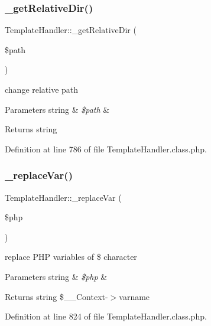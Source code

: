 \subsubsection{\texorpdfstring{\+\_\+get\+Relative\+Dir()}{\_getRelativeDir()}}
{\footnotesize\ttfamily Template\+Handler\+::\+\_\+get\+Relative\+Dir (\begin{DoxyParamCaption}\item[{}]{\$path }\end{DoxyParamCaption})}

change relative path 
\begin{DoxyParams}[1]{Parameters}
string & {\em \$path} & \\
\hline
\end{DoxyParams}
\begin{DoxyReturn}{Returns}
string 
\end{DoxyReturn}


Definition at line 786 of file Template\+Handler.\+class.\+php.

\mbox{\label{classTemplateHandler_a10cb255c35e1e617f182e349b80cc335}} 
\subsubsection{\texorpdfstring{\+\_\+replace\+Var()}{\_replaceVar()}}
{\footnotesize\ttfamily Template\+Handler\+::\+\_\+replace\+Var (\begin{DoxyParamCaption}\item[{}]{\$php }\end{DoxyParamCaption})}

replace P\+HP variables of \$ character 
\begin{DoxyParams}[1]{Parameters}
string & {\em \$php} & \\
\hline
\end{DoxyParams}
\begin{DoxyReturn}{Returns}
string \$\+\_\+\+\_\+\+Context-\/$>$varname 
\end{DoxyReturn}


Definition at line 824 of file Template\+Handler.\+class.\+php.

\mbox{\label{classTemplateHandler_aa3c14009a95a7258695563377f443e36}} 
